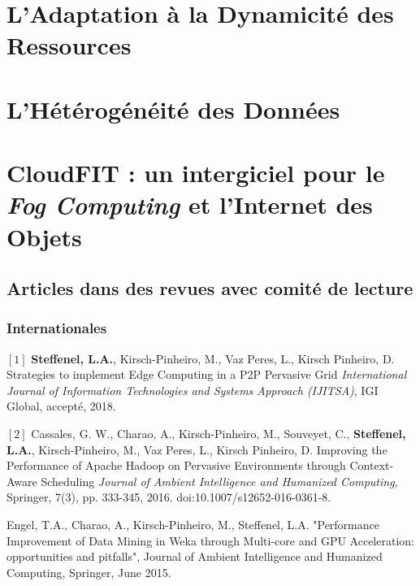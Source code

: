 \documentclass[final,twoside]{hdr} %
\begin{document}


\chapter{L'Adaptation à la Dynamicité des Ressources\label{chap:hadoop}}



\chapter{L'Hétérogénéité des Données\label{chap:grappes}}




\chapter{CloudFIT : un intergiciel pour le \textit{Fog Computing} et l'Internet des Objets\label{chap:CloudFIT}}








\section*{Articles dans des revues avec comité de lecture}

\subsection*{Internationales}

\noindent $[1]$
{\bf Steffenel, L.A.}, Kirsch-Pinheiro, M., Vaz Peres, L., Kirsch Pinheiro, D.
{Strategies to implement Edge Computing in a P2P Pervasive Grid}
{\em International Journal of Information Technologies and Systems Approach (IJITSA)}, IGI Global, accepté, 2018.

\noindent $[2]$
Cassales, G. W., Charao, A., Kirsch-Pinheiro, M., Souveyet, C., {\bf Steffenel, L.A.}, Kirsch-Pinheiro, M., Vaz Peres, L., Kirsch Pinheiro, D.
{Improving the Performance of Apache Hadoop on Pervasive Environments through Context-Aware Scheduling}
{\em  Journal of Ambient Intelligence and Humanized Computing}, Springer, 7(3), pp. 333-345, 2016. doi:10.1007/s12652-016-0361-8.

Engel, T.A., Charao, A., Kirsch-Pinheiro, M., Steffenel, L.A. "Performance Improvement of Data Mining in Weka through Multi-core and GPU Acceleration: opportunities and pitfalls", Journal of Ambient Intelligence and Humanized Computing, Springer, June 2015. 
\end{document}
